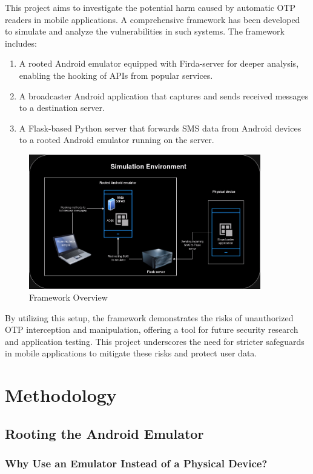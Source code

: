 \documentclass[a4paper,12pt]{article}
\begin{document}
This project aims to investigate the potential harm caused by automatic OTP readers in mobile applications. A comprehensive framework has been developed to simulate and analyze the vulnerabilities in such systems. The framework includes:

\begin{enumerate}
    \item A rooted Android emulator equipped with Firda-server for deeper analysis, enabling the hooking of APIs from popular services.
    \item A broadcaster Android application that captures and sends received messages to a destination server.
    \item A Flask-based Python server that forwards SMS data from Android devices to a rooted Android emulator running on the server.
\end{enumerate}

\begin{figure}[h]
    \centering
    \includegraphics[width=0.9\textwidth]{../images/architecture.png}
    \caption{Framework Overview}
\end{figure}
By utilizing this setup, the framework demonstrates the risks of unauthorized OTP interception and manipulation, offering a tool for future security research and application testing. This project underscores the need for stricter safeguards in mobile applications to mitigate these risks and protect user data.

\section{Methodology}
\subsection{Rooting the Android Emulator}
\subsubsection{Why Use an Emulator Instead of a Physical Device?}
\end{document}
